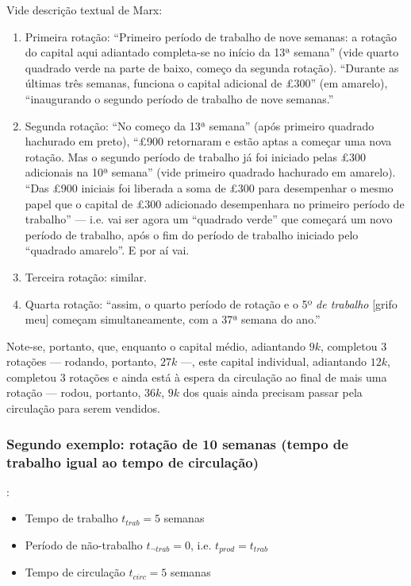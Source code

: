 Vide descrição textual de Marx:
\begin{enumerate}
\item Primeira rotação: ``Primeiro período de trabalho de nove semanas: a rotação do capital aqui adiantado completa-se no início da 13ª semana'' (vide quarto quadrado verde na parte de baixo, começo da segunda rotação). ``Durante as últimas três semanas, funciona o capital adicional de £300'' (em amarelo), ``inaugurando o segundo período de trabalho de nove semanas.'' 
\item Segunda rotação: ``No começo da 13ª semana'' (após primeiro quadrado hachurado em preto), ``£900 retornaram e estão aptas a começar uma nova rotação. Mas o segundo período de trabalho já foi iniciado pelas £300 adicionais na 10ª semana'' (vide primeiro quadrado hachurado em amarelo). ``Das £900 iniciais foi liberada a soma de £300 para desempenhar o mesmo papel que o capital de £300 adicionado desempenhara no primeiro período de trabalho'' — i.e. vai ser agora um ``quadrado verde'' que começará um novo período de trabalho, após o fim do período de trabalho iniciado pelo ``quadrado amarelo''. E por aí vai.
\item Terceira rotação: similar. 
\item Quarta rotação: ``assim, o quarto período de rotação e o 5º \textit{de trabalho} [grifo meu] começam simultaneamente, com a 37ª semana do ano.''
\end{enumerate}

Note-se, portanto, que, enquanto o capital médio, adiantando $9k$, completou $3$ rotações — rodando, portanto, $27k$ —, este capital individual, adiantando $12k$, completou $3$ rotações e ainda está à espera da circulação ao final de mais uma rotação — rodou, portanto, $36k$, $9k$ dos quais ainda precisam passar pela circulação para serem vendidos.

\subsubsection{Segundo exemplo: rotação de 10 semanas (tempo de trabalho igual ao tempo de circulação)}
\parencite[p. 357]{Marx2014} :
\begin{itemize}
\item Tempo de trabalho $t_{trab}=5$ semanas
\item Período de não-trabalho $t_{\lnot trab}=0$, i.e. $t_{prod}=t_{trab}$
\item Tempo de circulação $t_{circ}=5$ semanas
\end{itemize}

